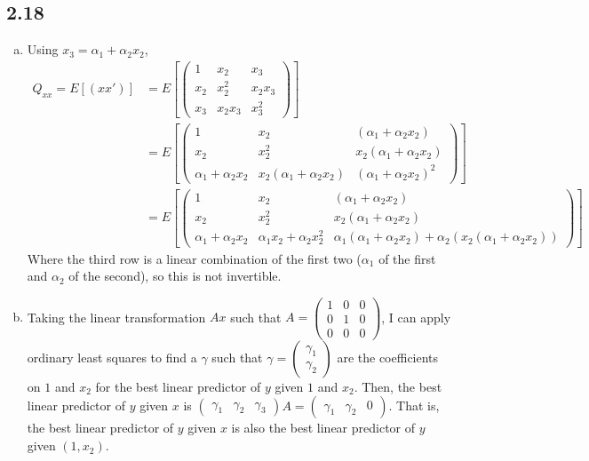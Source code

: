 \documentclass{article}[14pt]
\begin{document}
    \subsection*{2.18}
    \begin{enumerate}[(a)]
        \item Using $x_3 = \alpha_1 + \alpha_2 x_2$,
        \begin{align*}
            Q_{xx} = E[(xx')] &= E[\begin{pmatrix} 1 & x_2 & x_3 \\ x_2 & x_2^2 & x_2x_3 \\ x_3 & x_2x_3 & x_3^2 \end{pmatrix}] \\
            &= E[\begin{pmatrix} 1 & x_2 & (\alpha_1 + \alpha_2 x_2) \\ x_2 & x_2^2 & x_2(\alpha_1 + \alpha_2 x_2) \\ \alpha_1 + \alpha_2 x_2 & x_2(\alpha_1 + \alpha_2 x_2) & (\alpha_1 + \alpha_2 x_2)^2 \end{pmatrix}] \\
            &= E[\begin{pmatrix} 1 & x_2 & (\alpha_1 + \alpha_2 x_2) \\ x_2 & x_2^2 & x_2(\alpha_1 + \alpha_2 x_2) \\ \alpha_1 + \alpha_2 x_2 & \alpha_1x_2 + \alpha_2 x_2^2 & \alpha_1 (\alpha_1 + \alpha_2 x_2) + \alpha_2 (x_2(\alpha_1 + \alpha_2 x_2)) \end{pmatrix}]
        \end{align*}
        Where the third row is a linear combination of the first two ($\alpha_1$ of the first and $\alpha_2$ of the second), so this is not invertible.

        \item Taking the linear transformation $Ax$ such that $A = \begin{pmatrix} 1 & 0 & 0 \\ 0 & 1 & 0 \\ 0 & 0 & 0 \end{pmatrix}$, I can apply ordinary least squares to find a $\gamma$ such that $\gamma = \begin{pmatrix} \gamma_1 \\ \gamma_2 \end{pmatrix}$ are the coefficients on $1$ and $x_2$ for the best linear predictor of $y$ given $1$ and $x_2$. Then, the best linear predictor of $y$ given $x$ is $\begin{pmatrix} \gamma_1 & \gamma_2 & \gamma_3 \end{pmatrix} A = \begin{pmatrix} \gamma_1 & \gamma_2 & 0 \end{pmatrix}$. That is, the best linear predictor of $y$ given $x$ is also the best linear predictor of $y$ given $(1, x_2)$.

    \end{enumerate}
    
\end{document}
